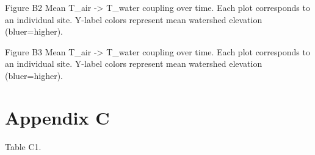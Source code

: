 \begin{center}
\end{center}
Figure B2 Mean T_{air} -> T_{water} coupling over time. Each plot corresponds to an individual site. Y-label colors represent mean watershed elevation (bluer=higher).

\begin{center}
\end{center}
Figure B3 Mean T_{air} -> T_{water} coupling over time. Each plot corresponds to an individual site. Y-label colors represent mean watershed elevation (bluer=higher).

\section*{Appendix C}

Table C1.
\begin{landscape}
\clearpage
{}
\end{landscape}


